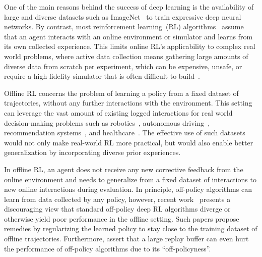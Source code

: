 One of the main reasons behind the success of deep learning
is the availability of large and diverse datasets such as
ImageNet~\citep{imagenet_cvpr09} to train expressive deep neural
networks. By contrast, most reinforcement learning~(RL)
algorithms~\citep{sutton2018reinforcement} assume that an agent
interacts with an online environment or simulator and learns from its
own collected experience. This limits online RL's applicability to complex real world problems, where active data
collection means gathering large amounts of diverse
data from scratch
per experiment, which can be expensive,
unsafe, or require a
high-fidelity simulator that is often difficult to build~\citep{dulac2019challenges}.

Offline RL concerns the problem of learning a policy from a fixed dataset of trajectories, without any further interactions with the environment. This setting
can leverage the vast amount of existing logged interactions for
real world decision-making problems such as
robotics~\citep{cabi2019framework, dasari2019robonet}, autonomous
driving~\citep{yu2018bdd100k}, recommendation
systems~\citep{strehletal10, bottou2013counterfactual}, and
healthcare~\citep{shortreed2011informing}. The effective use of
such datasets would not only make real-world RL
more practical, but would also enable better generalization
by incorporating diverse prior experiences.

In offline RL, an agent does not receive any new corrective feedback
from the online environment and needs to generalize from a fixed dataset of
interactions to new online interactions during evaluation. In
principle, off-policy algorithms can learn from data collected by any
policy, however, recent work~\citep{fujimoto2018off,
kumar2019stabilizing, wu2019behavior, siegel2020keep} presents a
discouraging view that standard off-policy deep RL algorithms diverge
or otherwise yield poor performance in the offline setting. Such
papers propose remedies by regularizing the learned policy to stay
close to the training dataset of offline trajectories.
Furthermore, \citet{Zhang2017ADL} assert that a large replay buffer can
even hurt the performance of off-policy algorithms due to its
``off-policyness''.

